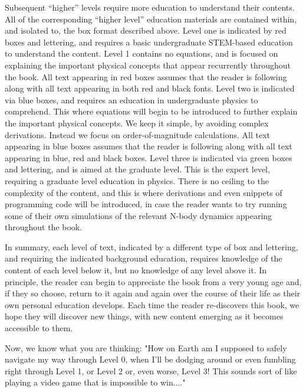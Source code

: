 \documentclass[main.tex]{subfiles}
\begin{document}
\par \nar Subsequent “higher” levels require more education to understand their contents.  All of the corresponding “higher level” education materials are contained within, and isolated to, the box format described above.  Level one is indicated by red boxes and lettering, and requires a basic undergraduate STEM-based education to understand the content.  Level 1 contains no equations, and is focused on explaining the important physical concepts that appear recurrently throughout the book.  All text appearing in red boxes assumes that the reader is following along with all text appearing in both red and black fonts.  Level two is indicated via blue boxes, and requires an education in undergraduate physics to comprehend.  This where equations will begin to be introduced to further explain the important physical concepts.  We keep it simple, by avoiding complex derivations.  Instead we focus on order-of-magnitude calculations.  All text appearing in blue boxes assumes that the reader is following along with all text appearing in blue, red and black boxes.  Level three is indicated via green boxes and lettering, and is aimed at the graduate level.  This is the expert level, requiring a graduate level education in physics.  There is no ceiling to the complexity of the content, and this is where derivations and even snippets of programming code will be introduced, in case the reader wants to try running some of their own simulations of the relevant N-body dynamics appearing throughout the book.  %

\par \nar In summary, each level of text, indicated by a different type of box and lettering, and requiring the indicated background education, requires knowledge of the content of each level below it, but no knowledge of any level above it.  In principle, the reader can begin to appreciate the book from a very young age and, if they so choose, return to it again and again over the course of their life as their own personal education develops.  Each time the reader re-discovers this book, we hope they will discover new things, with new content emerging as it becomes accessible to them.

\par \nar Now, we know what you are thinking:  "How on Earth am I supposed to safely navigate my way through Level 0, when I'll be dodging around or even fumbling right through Level 1, or Level 2 or, even worse, Level 3!  This sounds sort of like playing a video game that is impossible to win...." 
\end{document}
